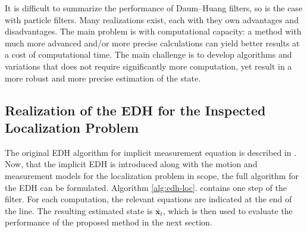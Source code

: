 It is difficult to summarize the performance of Daum--Huang filters, so is the case with particle filters. Many realizations exist, each with they own advantages and disadvantages. The main problem is with computational capacity: a method with much more advanced and/or more precise calculations can yield better results at a cost of computational time. The main challenge is to develop algorithms and variations that does not require significantly more computation, yet result in a more robust and more precise estimation of the state.

\subsection{Realization of the EDH for the Inspected Localization Problem}

The original EDH algorithm for implicit measurement equation is described
in \cite{Ding2012}.
Now, that the implicit EDH is introduced along with the motion and measurement models
for the localization problem in scope, the full algorithm for the EDH can be formulated.
Algorithm \ref{alg:edh-loc}. contains one step of the filter.
For each computation, the relevant equations are indicated at the end of the line.
The resulting estimated state is $\overline{\mathbf{x}}_t$, which is then used to evaluate the performance of the proposed method in the next section.
